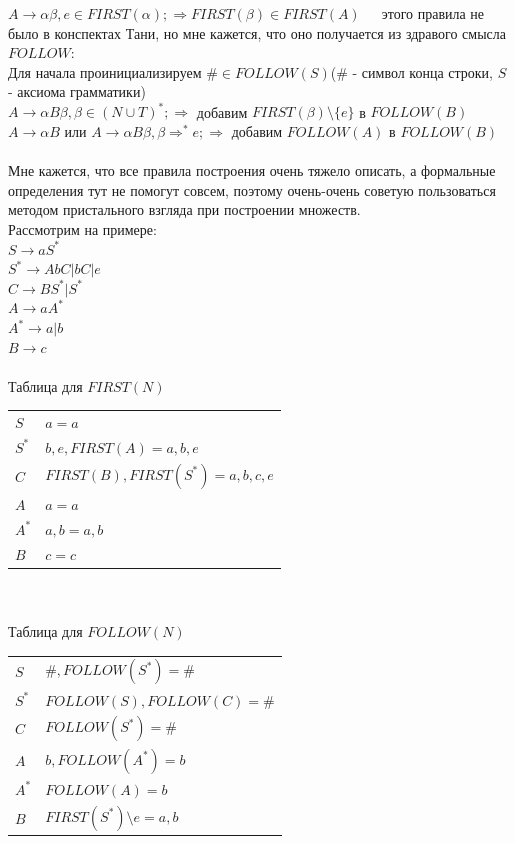 \documentclass[14pt]{extreport}
\begin{document}
	\hspace*{30pt} $A \to \alpha \beta, e \in FIRST(\alpha); \Rightarrow FIRST(\beta)
	\in FIRST(A)$\ \ \ этого правила не было в
	\hspace*{30pt} конспектах Тани, но мне кажется, что оно получается из здравого смысла\\
	$FOLLOW$:\\
	\hspace*{30pt}Для начала проинициализируем $\# \in FOLLOW(S)$(\# - символ конца строки,
	\hspace*{30pt}$S$ - аксиома грамматики)\\
	\hspace*{30pt}$A \to \alpha B \beta, \beta \in (N \cup T)^*; \Rightarrow$ добавим
	$FIRST(\beta) \setminus \{e\}$ в $FOLLOW(B)$\\
	\hspace*{30pt}$A \to \alpha B$ или $A \to \alpha B \beta, \beta \Rightarrow ^* e;
	\Rightarrow$ добавим $FOLLOW(A)$ в $FOLLOW(B)$\\\\
	Мне кажется, что все правила построения очень тяжело описать, а формальные определения
	тут не помогут совсем, поэтому очень-очень советую пользоваться методом пристального
	взгляда при построении множеств.\\
	Рассмотрим на примере:\\
	$S \to aS^*$\\
	$S^* \to AbC | bC | e$\\
	$C \to BS^* | S^*$\\
	$A \to aA^*$\\
	$A^* \to a|b$\\
	$B \to c$\\\\
	Таблица для $FIRST(N)$ \\
	\begin{tabular}{ll}
			 $S$ & $a=a$ \\
			 $S^*$ & $b,e,FIRST(A)=a,b,e$ \\
			 $C$ & $FIRST(B),FIRST(S^*)=a,b,c,e$ \\
			 $A$ & $a=a$ \\
			 $A^*$ & $a,b=a,b$ \\
			 $B$ & $c=c$ \\
	\end{tabular}\\\\
	\newpage
	Таблица для $FOLLOW(N)$ \\
	\begin{tabular}{ll}
			 $S$ & $\#,FOLLOW(S^*)=\#$ \\
			 $S^*$ & $FOLLOW(S),FOLLOW(C)=\#$ \\
			 $C$ & $FOLLOW(S^*)=\#$ \\
			 $A$ & $b,FOLLOW(A^*)=b$ \\
			 $A^*$ & $FOLLOW(A)=b$ \\
			 $B$ & $FIRST(S^*) \setminus e=a,b$ \\
	\end{tabular}\\\\
\end{document}

